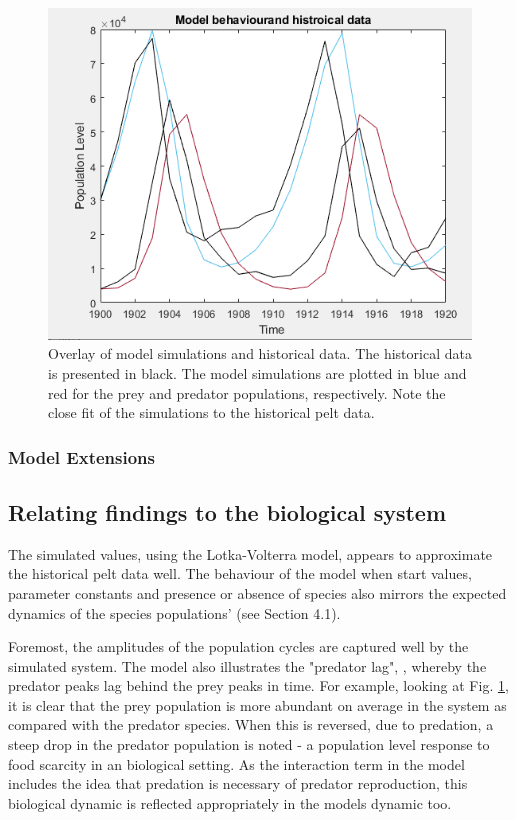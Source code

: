 \documentclass{article}
\begin{document}
\begin{figure}[H]
    \includegraphics[width = \textwidth]{results_3.PNG}
    \caption{Overlay of model simulations and historical data. The historical data is presented in black. The model simulations are plotted in blue and red for the prey and predator populations, respectively. Note the close fit of the simulations to the historical pelt data.}
    \label{fig:results_3}
\end{figure}

\subsubsection{Model Extensions}

 
\subsection{Relating findings to the biological system}
The simulated values, using the Lotka-Volterra model, appears to approximate the historical pelt data well. The behaviour of the model when start values, parameter constants and presence or absence of species also mirrors the expected dynamics of the species populations' (see Section 4.1). 

Foremost, the amplitudes of the population cycles are captured well by the simulated system. The model also illustrates the "predator lag", \parencite{tyson_modelling_2010}, whereby the predator peaks lag behind the prey peaks in time. For example, looking at Fig. \ref{fig:results_3}, it is clear that the prey population is more abundant on average in the system as compared with the predator species.  When this is reversed, due to predation, a steep drop in the predator population is noted - a population level response to food scarcity in an biological setting. As the interaction term in the model includes the idea that predation is necessary of predator reproduction, this biological dynamic is reflected appropriately in the models dynamic too. 
\end{document}
